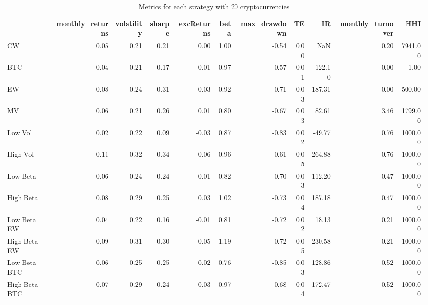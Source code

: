 \begin{table}
\centering
\caption{Metrics for each strategy with 20 cryptocurrencies}
\label{metrics20}
\begin{tabular}{lrrrrrrrrrr}
\toprule
{} &  monthly\_returns &  volatility &  sharpe &  excReturns &  beta &  max\_drawdown &   TE &      IR &  monthly\_turnover &     HHI \\
\midrule
CW            &             0.05 &        0.21 &    0.21 &        0.00 &  1.00 &         -0.54 & 0.00 &     NaN &              0.20 & 7941.00 \\
BTC           &             0.04 &        0.21 &    0.17 &       -0.01 &  0.97 &         -0.57 & 0.01 & -122.10 &              0.00 &    1.00 \\
EW            &             0.08 &        0.24 &    0.31 &        0.03 &  0.92 &         -0.71 & 0.03 &  187.31 &              0.00 &  500.00 \\
MV            &             0.06 &        0.21 &    0.26 &        0.01 &  0.80 &         -0.67 & 0.03 &   82.61 &              3.46 & 1799.00 \\
Low Vol       &             0.02 &        0.22 &    0.09 &       -0.03 &  0.87 &         -0.83 & 0.02 &  -49.77 &              0.76 & 1000.00 \\
High Vol      &             0.11 &        0.32 &    0.34 &        0.06 &  0.96 &         -0.61 & 0.05 &  264.88 &              0.76 & 1000.00 \\
Low Beta      &             0.06 &        0.24 &    0.24 &        0.01 &  0.82 &         -0.70 & 0.03 &  112.20 &              0.47 & 1000.00 \\
High Beta     &             0.08 &        0.29 &    0.25 &        0.03 &  1.02 &         -0.73 & 0.04 &  187.18 &              0.47 & 1000.00 \\
Low Beta EW   &             0.04 &        0.22 &    0.16 &       -0.01 &  0.81 &         -0.72 & 0.02 &   18.13 &              0.21 & 1000.00 \\
High Beta EW  &             0.09 &        0.31 &    0.30 &        0.05 &  1.19 &         -0.72 & 0.05 &  230.58 &              0.21 & 1000.00 \\
Low Beta BTC  &             0.06 &        0.25 &    0.25 &        0.02 &  0.76 &         -0.85 & 0.03 &  128.86 &              0.52 & 1000.00 \\
High Beta BTC &             0.07 &        0.29 &    0.24 &        0.03 &  0.97 &         -0.68 & 0.04 &  172.47 &              0.52 & 1000.00 \\
\bottomrule
\end{tabular}
\end{table}
